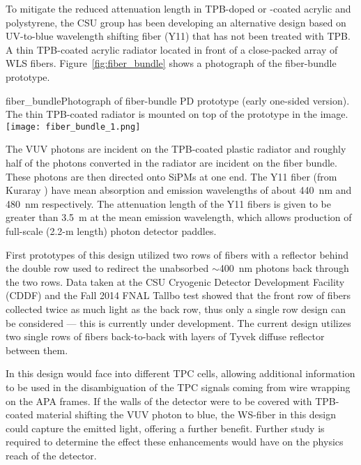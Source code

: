 To mitigate  the reduced attenuation length in TPB-doped or -coated acrylic and polystyrene,
the CSU group has
been developing an alternative design based on UV-to-blue
wavelength shifting fiber (Y11) that has not been treated with TPB.  A
thin TPB-coated acrylic radiator located in front of a close-packed
array of WLS fibers. Figure~\ref{fig:fiber_bundle} shows a photograph of the
fiber-bundle prototype. 

\begin{cdrfigure}{fiber_bundle}{Photograph of fiber-bundle PD prototype (early one-sided
  version). The thin TPB-coated radiator is mounted on top of the
  prototype in the image.}
  \texttt{[image: fiber\_bundle\_1.png]}
\end{cdrfigure}


The VUV photons are incident on the TPB-coated plastic radiator and
roughly half of the photons converted in the radiator are incident on
the %
fiber bundle. %
These photons are then directed onto SiPMs at one end. The Y11 fiber (from Kuraray ) have
mean absorption and emission wavelengths of about 440~nm and 480~nm
respectively.  The attenuation length of the Y11 fibers is given to be
greater than 3.5~m at the mean emission wavelength, which allows
production of full-scale (2.2-m length) photon detector paddles.

First prototypes of this design utilized two rows of fibers with a
reflector behind the double row used to redirect the unabsorbed $\sim$400~nm photons back
through the two rows.%
Data taken at the CSU Cryogenic Detector Development
Facility (CDDF) and the Fall 2014 FNAL Tallbo test 
showed that the front row of fibers collected
twice as much light as the back row, thus
only a single row
design can be considered --- this is currently under development. The current design
utilizes two single rows of fibers back-to-back with layers of  Tyvek
diffuse reflector between them.


In this design  would face into different TPC cells, allowing additional information to be
used in the disambiguation of the TPC signals coming from wire
wrapping on the APA frames. 
If the walls of the detector were to be 
covered with TPB-coated material shifting the VUV photon to blue,
 the WS-fiber in this design could capture the emitted light, offering 
 a further benefit. Further study is
required to determine the effect these enhancements would have on the physics
reach of the detector. 

